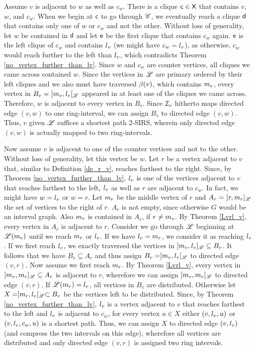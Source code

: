 \documentclass[10pt]{article}
\newcommand{\mvv}{\mv{v}}
\begin{document}
Assume $v$ is adjacent to $w$ as well as $c_w$.
There is a clique $\mathsf{c}\in\mathsf{X}$ that contains $v$, $w$, and $c_w$.
When we begin at $\mathsf{c}$ to go through $\mathscr{C}$,
we eventually reach a clique $\mathsf{d}$ that contains only one of $w$ or $c_w$
and not the other.
Without loss of generality, let $w$ be contained in $\mathsf{d}$ and let $\mathsf{e}$ be the first clique that contains $c_w$ again.
$\mathsf{e}$ is the left clique of $c_w$ and 
contains $l_{v}$ (we might have $c_w=l_{v}$), as
otherwise, $c_w$ would reach further to the left than $l_{v}$, 
which contradicts Theorem \ref{no_vertex_further_than_lv}.
Since $w$ and $c_w$ are counter vertices, all cliques we came across contained $w$.
Since the vertices in $\mathscr{L}$ are primary ordered by their 
left cliques and we also must have traversed $\beta(v)$, which contains $\mvv$, every vertex in 
$B_v=~]\mvv,\lvv[_\ri{L}$ appeared in at least one of the cliques we came across.
Therefore, $w$ is adjacent to every vertex in $B_v$.
Since $\mathcal{I}_v$ hitherto maps directed edge $(v,w)$ to one ring-interval, we can assign $B_v$ to directed edge $(v,w)$. 
Thus, $v$ given $\mathscr{L}$ suffices a shortest path 2-SIRS, wherein only directed edge $(v,w)$ is 
actually mapped to two ring-intervals.




Now assume $v$ is adjacent to one of the counter vertices and not to the other.
Without loss of generality, let this vertex be $w$.
Let $r$ be a vertex adjacent to $v$ that, similar to Definition \ref{de_r_v}, reaches farthest to the right.
Since, by Theorem \ref{no_vertex_further_than_lv}, $l_{v}$ is one of the vertices 
adjacent to $v$ that reaches farthest to the left, $l_{v}$ as well as $r$ are adjacent to $c_w$.
In fact, we might have $w=l_{v}$ or $w=r$.
Let $m_{r}$ be the middle vertex of $r$ and $A_r=~]r,m_{r}]_{\mathscr{L}}$ the set of vertices to the right of $r$.
$A_r$ is not empty, since otherwise $G$ would be an interval graph.
Also $\mvv$ is contained in $A_r$, if $r\neq\mvv$.
By Theorem \ref{Lvrl_v}, every vertex in $A_r$ is adjacent to $r$.
Consider we go through $\mathscr{L}$ beginning at $\ri{L}(\mvv)$ until we reach $m_{r}$ or $l_{v}$.
If we have $l_{v}=m_{r}$, we consider it as reaching $l_{v}$.
If we first reach $l_{v}$, we exactly traversed the vertices in $]\mvv,\lvv]_\ri{L}\subseteq B_v$.
It follows that we have $B_v\subseteq A_r$ and thus
assign $B_v=]\mvv,\lvv[_\ri{L}$ to directed edge $(v,r)$.
Now assume we first reach $m_{r}$. 
By Theorem \ref{Lvrl_v}, every vertex in $]\mvv,\mv{r}]_\ri{L}\subseteq A_r$ 
is adjacent to $r$, wherefore we can assign $]\mvv,\mv{r}]_\ri{L}$ to directed edge $(v,r)$.
If $\mathscr{L}(m_{r})=l_{v}$, all vertices in $B_v$ are distributed.
Otherwise let $X=]m_{r},l_{v}[_{\mathscr{L}}\subset B_v$ be the vertices left to be distributed.
Since, by Theorem \ref{no_vertex_further_than_lv}, $l_{v}$ is a vertex adjacent to $v$ 
that reaches farthest to the left and $l_{v}$ is adjacent to $c_w$, 
for every vertex $u\in X$ either $(v,l_{v},u)$ or $(v,l_{v},c_w,u)$ is a shortest path.
Thus, we can assign $X$ to directed edge $(v,l_{v})$ (and compress the two intervals on this edge),
wherefore all vertices are distributed and only directed edge $(v,r)$ is assigned two ring intervals.
\end{document}

